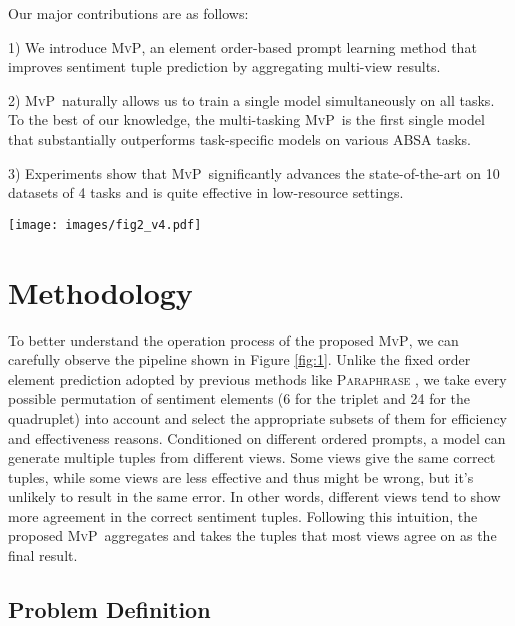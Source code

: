 \documentclass[11pt]{article}
\newcommand\mvp{\textsc{MvP}}
\begin{document}
Our major contributions are as follows:

    1) We introduce \mvp, an element order-based prompt learning method that improves sentiment tuple prediction by aggregating multi-view results.
    
    2) \mvp~naturally allows us to train a single model simultaneously on all tasks. To the best of our knowledge, the multi-tasking \mvp~is the first single model that substantially outperforms task-specific models on various ABSA tasks.
    
    3) Experiments show that \mvp~significantly advances the state-of-the-art on 10 datasets of 4 tasks and is quite effective in low-resource settings.



 \begin{figure*}[t]
  \centering
    \texttt{[image: images/fig2\_v4.pdf]}
    \caption{Multi-task learning. \mvp~uniformly tackles ABSA tasks 
    as combination of element order prompts.
    }
    \label{fig:multi-task}
\end{figure*}

\section{Methodology}


To better understand the operation process of the proposed \mvp, we can carefully observe the pipeline shown in Figure \ref{fig:1}. Unlike the fixed order element prediction adopted by previous methods like \textsc{Paraphrase} \cite{zhang-etal-2021-aspect-sentiment}, we take every possible permutation of sentiment elements (6 for the triplet and 24 for the quadruplet) into account and select the appropriate subsets of them for efficiency and effectiveness reasons.
Conditioned on different ordered prompts, a model can generate multiple tuples from different views. Some views give the same correct tuples, while some views are less effective and thus might be wrong, but it's unlikely to result in the same error.
In other words, different views tend to show more agreement in the correct sentiment tuples.
Following this intuition, the proposed \mvp~aggregates and 
takes the tuples that most views agree on as the final result.


\subsection{Problem Definition}
\end{document}
